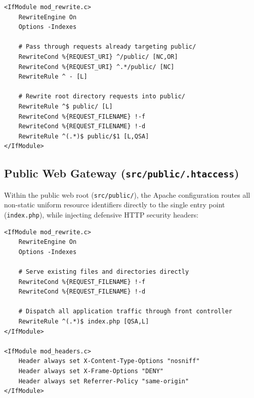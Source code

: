 \begin{lstlisting}[language=SQLANSI, caption={Root directory Apache rewrite rules (\texttt{.htaccess})}, label={lst:root_htaccess}]
<IfModule mod_rewrite.c>
    RewriteEngine On
    Options -Indexes

    # Pass through requests already targeting public/
    RewriteCond %{REQUEST_URI} ^/public/ [NC,OR]
    RewriteCond %{REQUEST_URI} ^.*/public/ [NC]
    RewriteRule ^ - [L]

    # Rewrite root directory requests into public/
    RewriteRule ^$ public/ [L]
    RewriteCond %{REQUEST_FILENAME} !-f
    RewriteCond %{REQUEST_FILENAME} !-d
    RewriteRule ^(.*)$ public/$1 [L,QSA]
</IfModule>
\end{lstlisting}

\subsection{Public Web Gateway (\texorpdfstring{\texttt{src/public/.htaccess}}{src/public/.htaccess})}
Within the public web root (\texttt{src/public/}), the Apache configuration routes all non-static uniform resource identifiers directly to the single entry point (\texttt{index.php}), while injecting defensive HTTP security headers:

\begin{lstlisting}[language=SQLANSI, caption={Public gateway rewrite and security configuration (\texttt{src/public/.htaccess})}, label={lst:public_htaccess}]
<IfModule mod_rewrite.c>
    RewriteEngine On
    Options -Indexes

    # Serve existing files and directories directly
    RewriteCond %{REQUEST_FILENAME} !-f
    RewriteCond %{REQUEST_FILENAME} !-d

    # Dispatch all application traffic through front controller
    RewriteRule ^(.*)$ index.php [QSA,L]
</IfModule>

<IfModule mod_headers.c>
    Header always set X-Content-Type-Options "nosniff"
    Header always set X-Frame-Options "DENY"
    Header always set Referrer-Policy "same-origin"
</IfModule>
\end{lstlisting}

